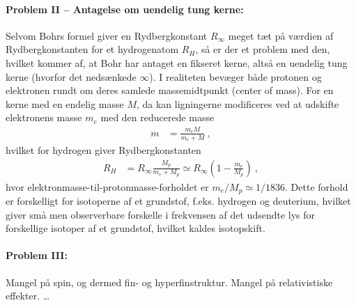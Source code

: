 \paragraph{Problem II -- Antagelse om uendelig tung kerne:} Selvom Bohrs formel giver en Rydbergkonstant $R_\infty$ meget tæt på værdien af Rydbergkonstanten for et hydrogenatom $R_H$, så er der et problem med den, hvilket kommer af, at Bohr har antaget en fikseret kerne, altså en uendelig tung kerne (hvorfor det nedsænkede $\infty$). I realiteten bevæger både protonen og elektronen rundt om deres samlede massemidtpunkt (center of mass). For en kerne med en endelig masse $M$, da kan ligningerne modificeres ved at udskifte elektronens masse $m_e$ med den reducerede masse
\begin{align}
    m &= \frac{m_e M}{m_e + M} \: ,
\end{align}
hvilket for hydrogen giver Rydbergkonstanten
\begin{align}
    R_H &= R_\infty \frac{M_p}{m_e + M_p} \simeq R_\infty \left(1 - \frac{m_e}{M_p}\right) \: ,
\end{align}
hvor elektronmasse-til-protonmasse-forholdet er $m_e/M_p \simeq 1/1836$. Dette forhold er forskelligt for isotoperne af et grundstof, f.eks. hydrogen og deuterium, hvilket giver små men observerbare forskelle i frekvensen af det udsendte lys for forskellige isotoper af et grundstof, hvilket kaldes isotopskift.


\paragraph{Problem III:} Mangel på spin, og dermed fin- og hyperfinstruktur. Mangel på relativistiske effekter. \ldots